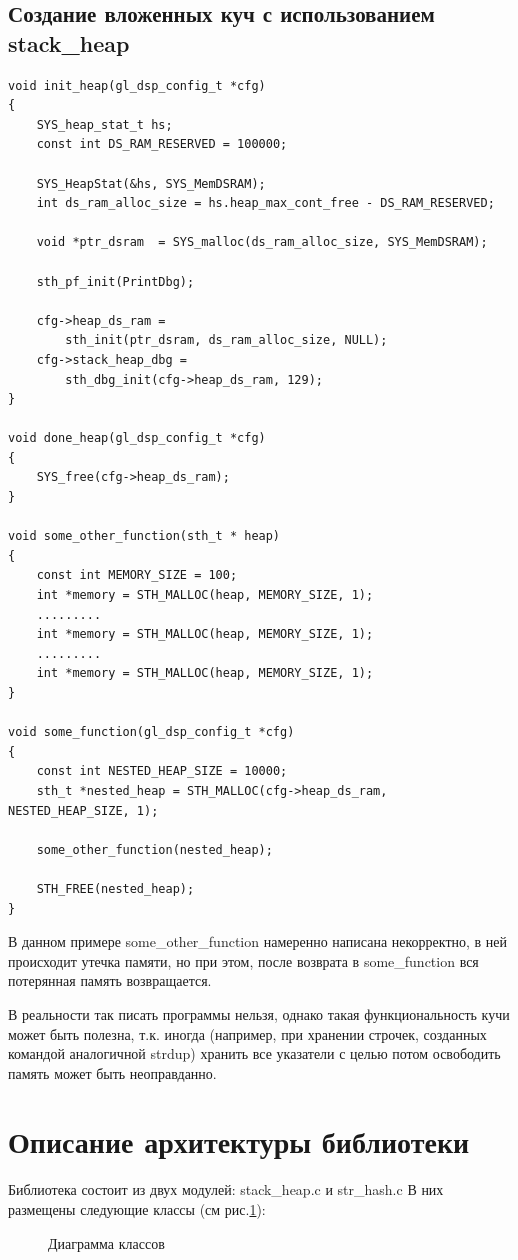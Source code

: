 \documentclass{article}
\begin{document}
\subsection{Создание вложенных куч с использованием stack\_heap }
\begin{lstlisting}
void init_heap(gl_dsp_config_t *cfg)
{
    SYS_heap_stat_t hs;
    const int DS_RAM_RESERVED = 100000;

    SYS_HeapStat(&hs, SYS_MemDSRAM);
    int ds_ram_alloc_size = hs.heap_max_cont_free - DS_RAM_RESERVED;

    void *ptr_dsram  = SYS_malloc(ds_ram_alloc_size, SYS_MemDSRAM);

    sth_pf_init(PrintDbg);

    cfg->heap_ds_ram =
        sth_init(ptr_dsram, ds_ram_alloc_size, NULL);
    cfg->stack_heap_dbg =
        sth_dbg_init(cfg->heap_ds_ram, 129);
}

void done_heap(gl_dsp_config_t *cfg)
{
    SYS_free(cfg->heap_ds_ram);
}

void some_other_function(sth_t * heap)
{
    const int MEMORY_SIZE = 100;
    int *memory = STH_MALLOC(heap, MEMORY_SIZE, 1);
    .........
    int *memory = STH_MALLOC(heap, MEMORY_SIZE, 1);
    .........
    int *memory = STH_MALLOC(heap, MEMORY_SIZE, 1);
}

void some_function(gl_dsp_config_t *cfg)
{
    const int NESTED_HEAP_SIZE = 10000;
    sth_t *nested_heap = STH_MALLOC(cfg->heap_ds_ram, NESTED_HEAP_SIZE, 1);
    
    some_other_function(nested_heap);

    STH_FREE(nested_heap);
}
\end{lstlisting}
В данном примере some\_other\_function намеренно написана некорректно, в ней происходит утечка памяти, но при этом, после возврата в some\_function вся потерянная память возвращается.

В реальности так писать программы нельзя, однако такая функциональность кучи может быть полезна, т.к. иногда (например, при хранении строчек, созданных командой аналогичной strdup) хранить все указатели с целью потом освободить память может быть неоправданно.
\newpage
\section{Описание архитектуры библиотеки}
Библиотека состоит из двух модулей: stack\_heap.c и str\_hash.c
В них размещены следующие классы (см рис.\ref{ris:classes diagram}):
\begin{figure}[h!]
	\caption{Диаграмма классов}
	\label{ris:classes diagram}
	\end{figure}
\end{document}
